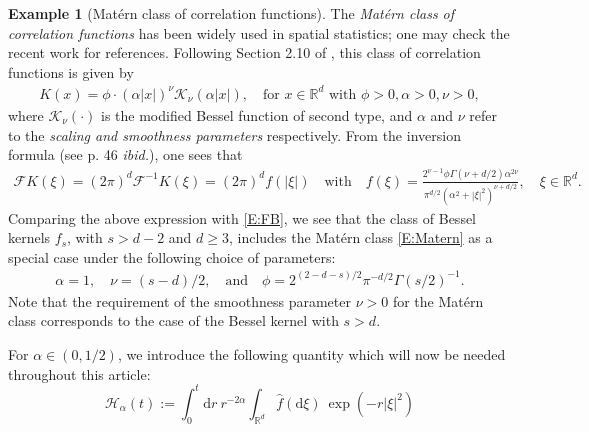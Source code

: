 \documentclass[12pt]{report}
\theoremstyle{plain}
\theoremstyle{definition}
\newtheorem{example}[theorem]{Example}
\numberwithin{equation}{section}
\newcommand{\R}{\mathbb{R}}
\newcommand{\ud}{\ensuremath{ \mathrm{d} }}
\begin{document}
\begin{example}[Mat\'ern class of correlation functions]
	The {\it Mat\'ern class of correlation functions} has been widely used in spatial statistics; one
	may check the recent work \cite{loh.sun.ea:21:on} for references. Following Section 2.10 of
	\cite{stein:99:interpolation}, this class of correlation functions is given by
	\begin{align} \label{E:Matern}
	K(x) = \phi \cdot (\alpha |x|)^\nu \mathcal{K}_\nu\left(\alpha |x|\right), \quad  \text{for
		$x\in\R^d$ with }\phi>0, \alpha>0, \nu >0 ,
	\end{align}
	where $\mathcal{K}_\nu(\cdot)$ is the modified Bessel function of second type, and $\alpha$ and $\nu$
	refer to the {\it scaling and smoothness parameters} respectively. From the inversion formula
	(see p. 46 {\it ibid.}), one sees that
	\begin{align*}
	\mathcal{F}K(\xi) = (2\pi)^{d} \mathcal{F}^{-1} K(\xi) = (2\pi)^d f(|\xi|)
	\quad \text{with} \quad
	f(\xi) = \frac{2^{\nu-1} \phi \Gamma\left(\nu +d/2\right)\alpha^{2\nu}}{\pi^{d/2}\left(\alpha^2+|\xi|^2\right)^{\nu+d/2}}, \quad  \xi\in\R^d.
	\end{align*}
	Comparing the above expression with \eqref{E:FB}, we see that the class of Bessel kernels $f_s$,
	with $s>d-2$ and $d\ge 3$, includes the Mat\'ern class \eqref{E:Matern} as a special case under
	the following choice of parameters:
	\begin{align*}
	\alpha = 1,\quad \nu=(s-d)/2,\quad  \text{and} \quad \phi= 2^{(2-d-s)/2} \pi^{-d/2} \Gamma(s /2)^{-1}.
	\end{align*}
	Note that the requirement of the smoothness parameter $\nu>0$ for the Mat\'ern class corresponds
	to the case of the Bessel kernel with $s>d$.
\end{example}

For $\alpha \in (0, 1/2)$, we introduce the following quantity which will now be needed throughout this article:
\begin{equation} \label{E:H}
\mathcal{H}_{\alpha}(t) := \int_0^t \ud r \: r^{-2\alpha} \int_{\R^d} \hat{f}(\ud \xi) \: \exp(-r|\xi|^2)
\end{equation}
\end{document}
